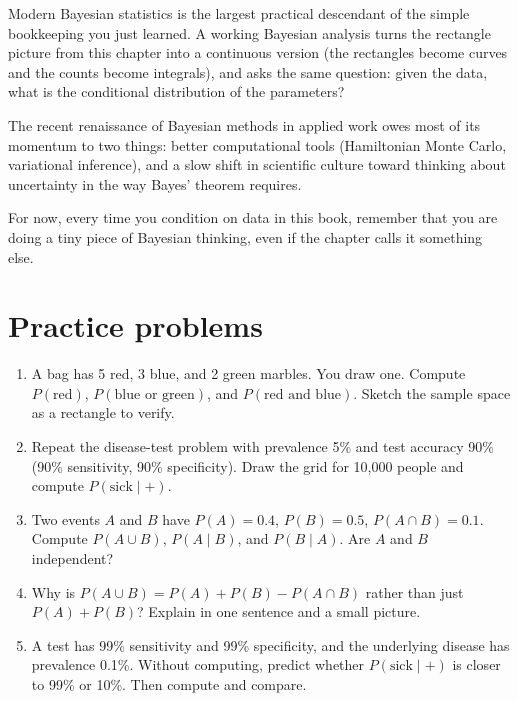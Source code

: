 \documentclass[
  letterpaper,
  11pt,
  twoside,
  openany]{scrbook}
\begin{document}
\begin{tcolorbox}[enhanced jigsaw, arc=.35mm, bottomrule=.15mm, bottomtitle=1mm, breakable, colback=white, colbacktitle=quarto-callout-important-color!10!white, colframe=quarto-callout-important-color-frame, coltitle=black, left=2mm, leftrule=.75mm, opacityback=0, opacitybacktitle=0.6, rightrule=.15mm, title=\textcolor{quarto-callout-important-color}{\faExclamation}\hspace{0.5em}{Frontier note}, titlerule=0mm, toprule=.15mm, toptitle=1mm]

Modern Bayesian statistics is the largest practical descendant of the
simple bookkeeping you just learned. A working Bayesian analysis turns
the rectangle picture from this chapter into a continuous version (the
rectangles become curves and the counts become integrals), and asks the
same question: given the data, what is the conditional distribution of
the parameters?

The recent renaissance of Bayesian methods in applied work owes most of
its momentum to two things: better computational tools (Hamiltonian
Monte Carlo, variational inference), and a slow shift in scientific
culture toward thinking about uncertainty in the way Bayes' theorem
requires.

For now, every time you condition on data in this book, remember that
you are doing a tiny piece of Bayesian thinking, even if the chapter
calls it something else.

\end{tcolorbox}

\section{Practice problems}\label{practice-problems-1}

\begin{enumerate}
\def\labelenumi{\arabic{enumi}.}
\item
  A bag has 5 red, 3 blue, and 2 green marbles. You draw one. Compute
  \(P(\text{red})\), \(P(\text{blue or green})\), and
  \(P(\text{red and blue})\). Sketch the sample space as a rectangle to
  verify.
\item
  Repeat the disease-test problem with prevalence 5\% and test accuracy
  90\% (90\% sensitivity, 90\% specificity). Draw the grid for 10,000
  people and compute \(P(\text{sick} \mid +)\).
\item
  Two events \(A\) and \(B\) have \(P(A) = 0.4\), \(P(B) = 0.5\),
  \(P(A \cap B) = 0.1\). Compute \(P(A \cup B)\), \(P(A \mid B)\), and
  \(P(B \mid A)\). Are \(A\) and \(B\) independent?
\item
  Why is \(P(A \cup B) = P(A) + P(B) - P(A \cap B)\) rather than just
  \(P(A) + P(B)\)? Explain in one sentence and a small picture.
\item
  A test has 99\% sensitivity and 99\% specificity, and the underlying
  disease has prevalence 0.1\%. Without computing, predict whether
  \(P(\text{sick} \mid +)\) is closer to 99\% or 10\%. Then compute and
  compare.
\end{enumerate}
\end{document}
